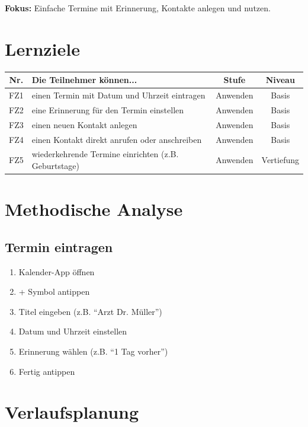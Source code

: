 \documentclass[11pt,a4paper]{article}
\begin{document}
\textbf{Fokus:} Einfache Termine mit Erinnerung, Kontakte anlegen und nutzen.

\section{Lernziele}

\begin{tabular}{|c|p{7cm}|c|c|}
\hline
\textbf{Nr.} & \textbf{Die Teilnehmer können...} & \textbf{Stufe} & \textbf{Niveau} \\
\hline
FZ1 & einen Termin mit Datum und Uhrzeit eintragen & Anwenden & Basis \\
FZ2 & eine Erinnerung für den Termin einstellen & Anwenden & Basis \\
FZ3 & einen neuen Kontakt anlegen & Anwenden & Basis \\
FZ4 & einen Kontakt direkt anrufen oder anschreiben & Anwenden & Basis \\
FZ5 & wiederkehrende Termine einrichten (z.B. Geburtstage) & Anwenden & Vertiefung \\
\hline
\end{tabular}

\section{Methodische Analyse}

\subsection{Termin eintragen}
\begin{tippbox}
\begin{enumerate}
    \item Kalender-App öffnen
    \item + Symbol antippen
    \item Titel eingeben (z.B. ``Arzt Dr. Müller'')
    \item Datum und Uhrzeit einstellen
    \item Erinnerung wählen (z.B. ``1 Tag vorher'')
    \item Fertig antippen
\end{enumerate}
\end{tippbox}

\section{Verlaufsplanung}
\end{document}
